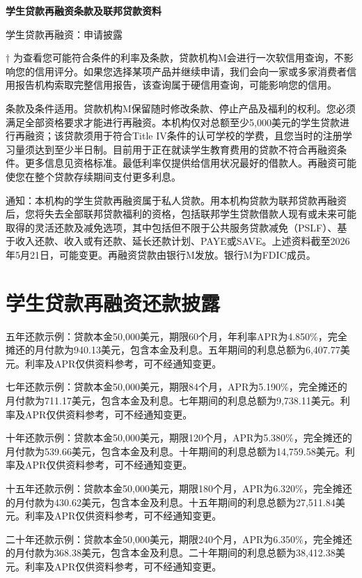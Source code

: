 \documentclass[UTF8,fontset=none,11pt,a4paper]{ctexart}
\begin{document}
{\noindent\LARGE\bfseries 学生贷款再融资条款及联邦贷款资料\par}
\vspace{10pt}
学生贷款再融资：申请披露


† 为查看您可能符合条件的利率及条款，贷款机构M会进行一次软信用查询，不影响您的信用评分。如果您选择某项产品并继续申请，我们会向一家或多家消费者信用报告机构索取完整信用报告，该查询属于硬信用查询，可能影响您的信用。


条款及条件适用。贷款机构M保留随时修改条款、停止产品及福利的权利。您必须满足全部资格要求才能进行再融资。本机构仅对总额至少5,000美元的学生贷款进行再融资；该贷款须用于符合Title IV条件的认可学校的学费，且您当时的注册学习量须达到至少半日制。目前用于正在就读学生教育费用的贷款不符合再融资条件。更多信息见资格标准。最低利率仅提供给信用状况最好的借款人。再融资可能使您在整个贷款存续期间支付更多利息。


通知：本机构的学生贷款再融资属于私人贷款。用本机构贷款为联邦贷款再融资后，您将失去全部联邦贷款福利的资格，包括联邦学生贷款借款人现有或未来可能取得的灵活还款及减免选项，其中包括但不限于公共服务贷款减免（PSLF）、基于收入还款、收入或有还款、延长还款计划、PAYE或SAVE。上述资料截至2026年5月21日，可能变更。再融资贷款由银行M发放。银行M为FDIC成员。


\section*{学生贷款再融资还款披露}
五年还款示例：贷款本金50,000美元，期限60个月，年利率APR为4.850\%，完全摊还的月付款为940.13美元，包含本金及利息。五年期间的利息总额为6,407.77美元。利率及APR仅供资料参考，可不经通知变更。


七年还款示例：贷款本金50,000美元，期限84个月，APR为5.190\%，完全摊还的月付款为711.17美元，包含本金及利息。七年期间的利息总额为9,738.11美元。利率及APR仅供资料参考，可不经通知变更。


十年还款示例：贷款本金50,000美元，期限120个月，APR为5.380\%，完全摊还的月付款为539.66美元，包含本金及利息。十年期间的利息总额为14,759.58美元。利率及APR仅供资料参考，可不经通知变更。


十五年还款示例：贷款本金50,000美元，期限180个月，APR为6.320\%，完全摊还的月付款为430.62美元，包含本金及利息。十五年期间的利息总额为27,511.84美元。利率及APR仅供资料参考，可不经通知变更。


二十年还款示例：贷款本金50,000美元，期限240个月，APR为6.350\%，完全摊还的月付款为368.38美元，包含本金及利息。二十年期间的利息总额为38,412.38美元。利率及APR仅供资料参考，可不经通知变更。
\end{document}
